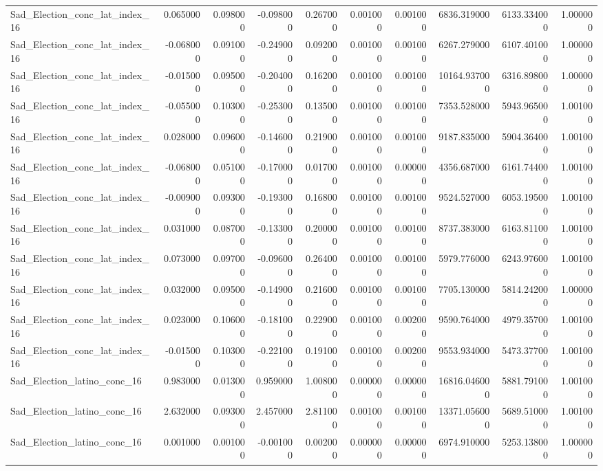 \begin{table}
\begin{tabular}{lrrrrrrrrr}
Sad_Election_conc_lat_index_16 & 0.065000 & 0.098000 & -0.098000 & 0.267000 & 0.001000 & 0.001000 & 6836.319000 & 6133.334000 & 1.000000 \\
Sad_Election_conc_lat_index_16 & -0.068000 & 0.091000 & -0.249000 & 0.092000 & 0.001000 & 0.001000 & 6267.279000 & 6107.401000 & 1.000000 \\
Sad_Election_conc_lat_index_16 & -0.015000 & 0.095000 & -0.204000 & 0.162000 & 0.001000 & 0.001000 & 10164.937000 & 6316.898000 & 1.000000 \\
Sad_Election_conc_lat_index_16 & -0.055000 & 0.103000 & -0.253000 & 0.135000 & 0.001000 & 0.001000 & 7353.528000 & 5943.965000 & 1.001000 \\
Sad_Election_conc_lat_index_16 & 0.028000 & 0.096000 & -0.146000 & 0.219000 & 0.001000 & 0.001000 & 9187.835000 & 5904.364000 & 1.001000 \\
Sad_Election_conc_lat_index_16 & -0.068000 & 0.051000 & -0.170000 & 0.017000 & 0.001000 & 0.000000 & 4356.687000 & 6161.744000 & 1.001000 \\
Sad_Election_conc_lat_index_16 & -0.009000 & 0.093000 & -0.193000 & 0.168000 & 0.001000 & 0.001000 & 9524.527000 & 6053.195000 & 1.001000 \\
Sad_Election_conc_lat_index_16 & 0.031000 & 0.087000 & -0.133000 & 0.200000 & 0.001000 & 0.001000 & 8737.383000 & 6163.811000 & 1.001000 \\
Sad_Election_conc_lat_index_16 & 0.073000 & 0.097000 & -0.096000 & 0.264000 & 0.001000 & 0.001000 & 5979.776000 & 6243.976000 & 1.001000 \\
Sad_Election_conc_lat_index_16 & 0.032000 & 0.095000 & -0.149000 & 0.216000 & 0.001000 & 0.001000 & 7705.130000 & 5814.242000 & 1.000000 \\
Sad_Election_conc_lat_index_16 & 0.023000 & 0.106000 & -0.181000 & 0.229000 & 0.001000 & 0.002000 & 9590.764000 & 4979.357000 & 1.001000 \\
Sad_Election_conc_lat_index_16 & -0.015000 & 0.103000 & -0.221000 & 0.191000 & 0.001000 & 0.002000 & 9553.934000 & 5473.377000 & 1.001000 \\
Sad_Election_latino_conc_16 & 0.983000 & 0.013000 & 0.959000 & 1.008000 & 0.000000 & 0.000000 & 16816.046000 & 5881.791000 & 1.001000 \\
Sad_Election_latino_conc_16 & 2.632000 & 0.093000 & 2.457000 & 2.811000 & 0.001000 & 0.001000 & 13371.056000 & 5689.510000 & 1.001000 \\
Sad_Election_latino_conc_16 & 0.001000 & 0.001000 & -0.001000 & 0.002000 & 0.000000 & 0.000000 & 6974.910000 & 5253.138000 & 1.000000 \\

\end{tabular}
\end{table}
